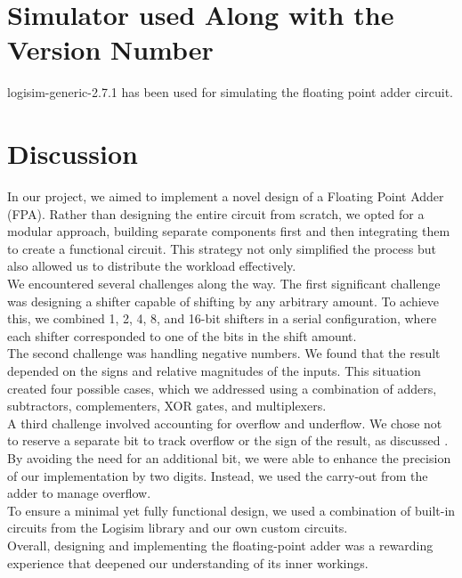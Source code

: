\documentclass[a4paper,12pt]{article}
\begin{document}
\section{Simulator used Along with the Version Number}
logisim-generic-2.7.1 has been used for simulating the floating point adder circuit.


\section{Discussion}
In our project, we aimed to implement a novel design of a Floating Point Adder (FPA). Rather than designing the entire circuit from scratch, we opted for a modular approach, building separate components first and then integrating them to create a functional circuit. This strategy not only simplified the process but also allowed us to distribute the workload effectively.
\newline
\\
We encountered several challenges along the way. The first significant challenge was designing a shifter capable of shifting by any arbitrary amount. To achieve this, we combined 1, 2, 4, 8, and 16-bit shifters in a serial configuration, where each shifter corresponded to one of the bits in the shift amount.\\
\newline
The second challenge was handling negative numbers. We found that the result depended on the signs and relative magnitudes of the inputs. This situation created four possible cases, which we addressed using a combination of adders, subtractors, complementers, XOR gates, and multiplexers.\\
\newline
A third challenge involved accounting for overflow and underflow. We chose not to reserve a separate bit to track overflow or the sign of the result, as discussed . By avoiding the need for an additional bit, we were able to enhance the precision of our implementation by two digits. Instead, we used the carry-out from the adder to manage overflow.\\
\newline
To ensure a minimal yet fully functional design, we used a combination of built-in circuits from the Logisim library and our own custom circuits.\\
\newline
Overall, designing and implementing the floating-point adder was a rewarding experience that deepened our understanding of its inner workings.
\end{document}
